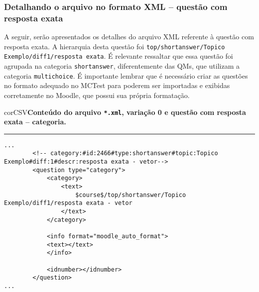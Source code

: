 \subsubsection{Detalhando o arquivo no formato XML -- questão com resposta exata}

A seguir, serão apresentados os detalhes do arquivo XML referente à questão com resposta exata. A hierarquia desta questão foi \verb|top/shortanswer/Topico Exemplo/diff1/resposta exata|. É relevante ressaltar que essa questão foi agrupada na categoria \verb|shortanswer|, diferentemente das QMs, que utilizam a categoria \verb|multichoice|. É importante lembrar que é necessário criar as questões no formato adequado no MCTest para poderem ser importadas e exibidas corretamente no Moodle, que possui sua própria formatação.

\begin{myboxCode}{corCSV}{\textbf{Conteúdo do arquivo \texttt{*.xml}, variação 0 e questão com resposta exata -- categoria.}}\vspace{3mm}
\hrule
{\scriptsize
\begin{verbatim}
...
        <!-- category:#id:2466#type:shortanswer#topic:Topico Exemplo#diff:1#descr:resposta exata - vetor-->
        <question type="category">
            <category>
                <text>
                    $course$/top/shortanswer/Topico Exemplo/diff1/resposta exata - vetor
                </text>
            </category>
            
            <info format="moodle_auto_format">
            <text></text>
            </info>
            
            <idnumber></idnumber>
        </question>
...
\end{verbatim}
}
\end{myboxCode}

